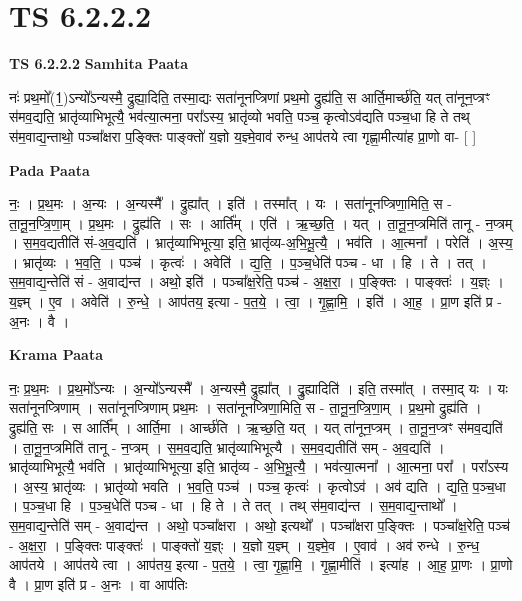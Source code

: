 \documentclass[17pt]{extarticle}
\begin{document}
\section{ TS 6.2.2.2 }

\textbf{TS 6.2.2.2 } \newline
\textbf{Samhita Paata} \newline

नः॑ प्रथ॒मो᳚(1॒)ऽन्यो᳚ऽन्यस्मै॒ द्रुह्या॒दिति॒ तस्मा॒द्यः सता॑नूनप्त्रिणां प्रथ॒मो द्रुह्य॑ति॒ स आर्ति॒मार्च्छ॑ति॒ यत् ता॑नून॒प्त्रꣳ स॑मव॒द्यति॒ भ्रातृ॑व्याभिभूत्यै॒ भव॑त्या॒त्मना॒ परा᳚ऽस्य॒ भ्रातृ॑व्यो भवति॒ पञ्च॒ कृत्वोऽव॑द्यति पञ्च॒धा हि ते तथ् स॑म॒वाद्य॒न्ताथो॒ पञ्चा᳚क्षरा प॒ङ्क्तिः पाङ्क्तो॑ य॒ज्ञो य॒ज्ञ्मे॒वाव॑ रुन्ध॒ आप॑तये त्वा गृह्णा॒मीत्या॑ह प्रा॒णो वा- [  ] \newline

\textbf{Pada Paata} \newline

नः॒ । प्र॒थ॒मः । अ॒न्यः । अ॒न्यस्मै᳚ । द्रुह्या᳚त् । इति॑ । तस्मा᳚त् । यः । सता॑नूनप्त्रिणा॒मिति॒ स - ता॒नू॒न॒प्त्रि॒णा॒म् । प्र॒थ॒मः । द्रुह्य॑ति । सः । आर्ति᳚म् । एति॑ । ऋ॒च्छ॒ति॒ । यत् । ता॒नू॒न॒प्त्रमिति॑ तानू - न॒प्त्रम् । स॒म॒व॒द्यतीति॑ सं-अ॒व॒द्यति॑ । भ्रातृ॑व्याभिभूत्या॒ इति॒ भ्रातृ॑व्य-अ॒भि॒भू॒त्यै॒ । भव॑ति । आ॒त्मना᳚ । परेति॑ । अ॒स्य॒ । भ्रातृ॑व्यः । भ॒व॒ति॒ । पञ्च॑ । कृत्वः॑ । अवेति॑ । द्य॒ति॒ । प॒ञ्च॒धेति॑ पञ्च - धा । हि । ते । तत् । स॒म॒वाद्य॒न्तेति॑ सं - अ॒वाद्य॑न्त । अथो॒ इति॑ । पञ्चा᳚क्ष॒रेति॒ पञ्च॑ - अ॒क्ष॒रा॒ । प॒ङ्क्तिः । पाङ्क्तः॑ । य॒ज्ञ्ः । य॒ज्ञ्म् । ए॒व । अवेति॑ । रु॒न्धे॒ । आप॑तय॒ इत्या - प॒त॒ये॒ । त्वा॒ । गृ॒ह्णा॒मि॒ । इति॑ । आ॒ह॒ । प्रा॒ण इति॑ प्र - अ॒नः । वै ।  \newline


\textbf{Krama Paata} \newline

नः॒ प्र॒थ॒मः । प्र॒थ॒मो᳚ऽन्यः । अ॒न्यो᳚ऽन्यस्मै᳚ । अ॒न्यस्मै॒ द्रुह्या᳚त् । द्रु॒ह्यादिति॑ । इति॒ तस्मा᳚त् । तस्मा॒द् यः । यः सता॑नूनप्त्रिणाम् । सता॑नूनप्त्रिणाम् प्रथ॒मः । सता॑नूनप्त्रिणा॒मिति॒ स - ता॒नू॒न॒प्त्रि॒णा॒म् । प्र॒थ॒मो द्रुह्य॑ति । द्रुह्य॑ति॒ सः । स आर्ति᳚म् । आर्ति॒मा । आर्च्छ॑ति । ऋ॒च्छ॒ति॒ यत् । यत् ता॑नून॒प्त्रम् । ता॒नू॒न॒प्त्रꣳ स॑मव॒द्यति॑ । ता॒नू॒न॒प्त्रमिति॑ तानू - न॒प्त्रम् । स॒म॒व॒द्यति॒ भ्रातृ॑व्याभिभूत्यै । स॒म॒व॒द्यतीति॑ सम् - अ॒व॒द्यति॑ । भ्रातृ॑व्याभिभूत्यै॒ भव॑ति । भ्रातृ॑व्याभिभूत्या॒ इति॒ भ्रातृ॑व्य - अ॒भि॒भू॒त्यै॒ । भव॑त्या॒त्मना᳚ । आ॒त्मना॒ परा᳚ । परा᳚ऽस्य । अ॒स्य॒ भ्रातृ॑व्यः । भ्रातृ॑व्यो भवति । भ॒व॒ति॒ पञ्च॑ । पञ्च॒ कृत्वः॑ । कृत्वोऽव॑ । अव॑ द्यति । द्य॒ति॒ प॒ञ्च॒धा । प॒ञ्च॒धा हि । प॒ञ्च॒धेति॑ पञ्च - धा । हि ते । ते तत् । तथ् स॑म॒वाद्य॑न्त । स॒म॒वाद्य॒न्ताथो᳚ । स॒म॒वाद्य॒न्तेति॑ सम् - अ॒वाद्य॑न्त । अथो॒ पञ्चा᳚क्षरा । अथो॒ इत्यथो᳚ । पञ्चा᳚क्षरा प॒ङ्‍क्तिः । पञ्चा᳚क्ष॒रेति॒ पञ्च॑ - अ॒क्ष॒रा॒ । प॒ङ्‍क्तिः पाङ्‍क्तः॑ । पाङ्‍क्तो॑ य॒ज्ञ्ः । य॒ज्ञो य॒ज्ञ्म् । य॒ज्ञ्मे॒व । ए॒वाव॑ । अव॑ रुन्धे । रु॒न्ध॒ आप॑तये । आप॑तये त्वा । आप॑तय॒ इत्या - प॒त॒ये॒ । त्वा॒ गृ॒ह्णा॒मि॒ । गृ॒ह्णा॒मीति॑ । इत्या॑ह । आ॒ह॒ प्रा॒णः । प्रा॒णो वै । प्रा॒ण इति॑ प्र - अ॒नः । वा आप॑तिः \newline
\end{document}
